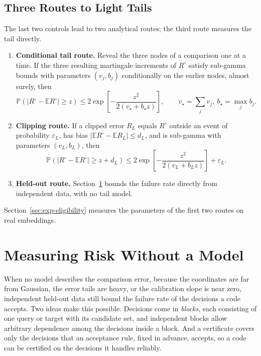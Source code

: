 \documentclass[twoside,11pt]{article}
\newcommand{\E}{\mathbb{E}}
\newcommand{\Pp}{\mathbb{P}}
\begin{document}
\subsection{Three Routes to Light Tails}
\label{sec:routes}

The last two controls lead to two analytical routes; the third route measures the tail directly.
\begin{enumerate}
\setlength{\itemsep}{2pt}
\setlength{\parsep}{0pt}
\item \textbf{Conditional tail route.} Reveal the three nodes of a comparison one at a time. If the three resulting martingale increments of $R^\circ$ satisfy sub-gamma bounds with parameters $(v_j,b_j)$ conditionally on the earlier nodes, almost surely, then
\begin{equation}
\Pp(|R^\circ-\E R^\circ|\ge z)\le2\exp\!\left[-\frac{z^2}{2(v_\star+b_\star z)}\right],\qquad v_\star=\sum_jv_j,\ b_\star=\max_jb_j.
\label{eq:conditional-mgf-tail}
\end{equation}
\item \textbf{Clipping route.} If a clipped error $R_L$ equals $R^\circ$ outside an event of probability $\varepsilon_L$, has bias $|\E R^\circ-\E R_L|\le d_L$, and is sub-gamma with parameters $(v_L,b_L)$, then
\begin{equation}
\Pp(|R^\circ-\E R^\circ|\ge z+d_L)\le2\exp\!\left[-\frac{z^2}{2(v_L+b_Lz)}\right]+\varepsilon_L.
\end{equation}
\item \textbf{Held-out route.} Section~\ref{sec:heldout} bounds the failure rate directly from independent data, with no tail model.
\end{enumerate}
Section~\ref{sec:exp-eligibility} measures the parameters of the first two routes on real embeddings.

\section{Measuring Risk Without a Model}
\label{sec:heldout}

When no model describes the comparison error, because the coordinates are far from Gaussian, the error tails are heavy, or the calibration slope is near zero, independent held-out data still bound the failure rate of the decisions a code accepts. Two ideas make this possible. Decisions come in \emph{blocks}, each consisting of one query or target with its candidate set, and independent blocks allow arbitrary dependence among the decisions inside a block. And a certificate covers only the decisions that an acceptance rule, fixed in advance, accepts, so a code can be certified on the decisions it handles reliably.
\end{document}
